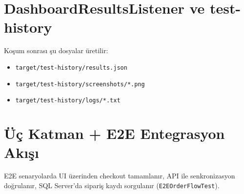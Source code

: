 \section{DashboardResultsListener ve test-history}
Koşum sonrası şu dosyalar üretilir:
\begin{itemize}
  \item \texttt{target/test-history/results.json}
  \item \texttt{target/test-history/screenshots/*.png}
  \item \texttt{target/test-history/logs/*.txt}
\end{itemize}

\section{Üç Katman + E2E Entegrasyon Akışı}
E2E senaryolarda UI üzerinden checkout tamamlanır, API ile senkronizasyon doğrulanır, SQL Server'da sipariş kaydı sorgulanır (\texttt{E2EOrderFlowTest}).

